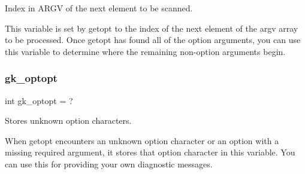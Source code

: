 Index in A\+R\+GV of the next element to be scanned. 

This variable is set by getopt to the index of the next element of the argv array to be processed. Once getopt has found all of the option arguments, you can use this variable to determine where the remaining non-\/option arguments begin. \mbox{\label{a00038_ac77d8583b792a19e5afae69bb702a23a}} 
\subsubsection{\texorpdfstring{gk\+\_\+optopt}{gk\_optopt}}
{\footnotesize\ttfamily int gk\+\_\+optopt = \textquotesingle{}?\textquotesingle{}}



Stores unknown option characters. 

When getopt encounters an unknown option character or an option with a missing required argument, it stores that option character in this variable. You can use this for providing your own diagnostic messages. 